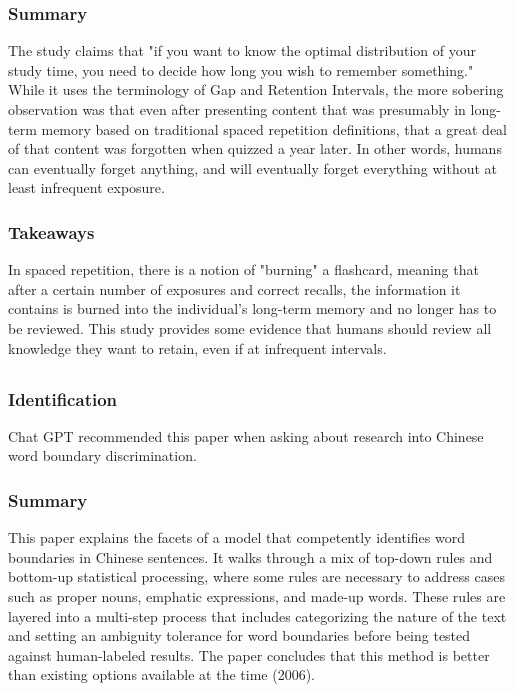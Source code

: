 \documentclass[
	letterpaper, %
]{jdf}
\begin{document}
\subsubsection{Summary}
The study claims that "if you want to know the optimal distribution of your study time, you need to decide how long you wish to remember something." While it uses the terminology of Gap and Retention Intervals, the more sobering observation was that even after presenting content that was presumably in long-term memory based on traditional spaced repetition definitions, that a great deal of that content was forgotten when quizzed a year later. In other words, humans can eventually forget anything, and will eventually forget everything without at least infrequent exposure.

\subsubsection{Takeaways}
In spaced repetition, there is a notion of "burning" a flashcard, meaning that after a certain number of exposures and correct recalls, the information it contains is burned into the individual's long-term memory and no longer has to be reviewed. This study provides some evidence that humans should review all knowledge they want to retain, even if at infrequent intervals.

\subsection{}
\subsubsection{Identification}
Chat GPT recommended this paper when asking about research into Chinese word boundary discrimination.

\subsubsection{Summary}
This paper explains the facets of a model that competently identifies word boundaries in Chinese sentences. It walks through a mix of top-down rules and bottom-up statistical processing, where some rules are necessary to address cases such as proper nouns, emphatic expressions, and made-up words. These rules are layered into a multi-step process that includes categorizing the nature of the text and setting an ambiguity tolerance for word boundaries before being tested against human-labeled results. The paper concludes that this method is better than existing options available at the time (2006).
\end{document}
